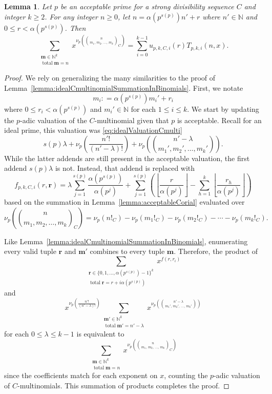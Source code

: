 \documentclass{amsart}
\newtheorem{lemma}[theorem]{Lemma}
\theoremstyle{definition}
\DeclareMathOperator{\total}{total}
\newcommand{\N}{\mathbb{N}}
\newcommand{\colonequal}{\mathrel{\mathop:}=}
\begin{document}
\begin{lemma}\label{lemma:acceptableCmultinomialSummationInBinomial}
Let $p$ be an acceptable prime for a strong divisibility sequence $C$ and integer $k\geq2$. For any integer $n\geq0$, let $n=\alpha(p^{s(p)})n'+r$ where $ n' \in \N $ and $0 \leq r <\alpha(p^{s(p)})$. Then
\[\sum_{\substack{\mathbf{m} \in \N^k \\ \total\mathbf{m} = n}} x^{\nu_p\!\left(\binom{n}{m_1,\, m_2,\, \dots,\, m_k}_C\right)} = \sum\limits_{i=0}^{k-1}u_{p,k,C,i}(r)T_{p,k,i}(n,x).\]
\end{lemma}

\begin{proof}
We rely on generalizing the many similarities to the proof of Lemma~\ref{lemma:idealCmultinomialSummationInBinomials}. 
First, we notate $$m_i\colonequal\alpha(p^{s(p)})m_i'+r_i$$ where $ 0 \leq r_i < \alpha(p^{s(p)}) $ and $ m_i' \in \N $ for each $1 \leq i \leq k$. 
We start by updating the $p$-adic valuation of the $C$-multinomial given that $p$ is acceptable. Recall for an ideal prime, this valuation was \eqref{eq:idealValuationCmulti} $$s(p)\lambda+\nu_p\!\left(\frac{n'!}{(n'-\lambda)!}\right) + \nu_p\!\left(\binom{n'-\lambda}{m_1', m_2', \dots,m_k'}\right). $$ 
While the latter addends are still present in the acceptable valuation, the first addend $s(p)\lambda$ is not. 
Instead, that addend is replaced with 
$$f_{p,k,C,i}(r,\mathbf{r})=\lambda\sum_{j=1}^{s(p)}\frac{\alpha(p^{s(p)})}{\alpha(p^{j})} + \sum_{j=1}^{s(p)}\left( \left\lfloor\frac{r}{\alpha(p^{j})} \right\rfloor - \sum_{h=1}^k\left\lfloor\frac{r_h}{\alpha(p^{j})} \right\rfloor \right)
$$ 
based on the summation in Lemma~\ref{lemma:acceptableCorial} evaluated over $$\nu_p\!\left(\binom{n}{m_1,m_2,\dots,m_k}_C\right)=\nu_p(n!_C)-\nu_p(m_1!_C)-\nu_p(m_2!_C)-\cdots-\nu_p(m_k!_C).$$ 

Like Lemma~\ref{lemma:idealCmultinomialSummationInBinomials}, enumerating every valid tuple $\mathbf{r}$ and $\mathbf{m'}$ combines to every tuple $\mathbf{m}$. Therefore, the product of $$\sum_{\substack{\mathbf{r} \in \{0, 1, \ldots,\alpha(p^{s(p)})-1\}^k \\ \total\mathbf{r} = r+i\alpha(p^{s(p)})}}x^{f(r, r_i)}$$ and 
$$x^{\nu_p\!\left(\frac{n'!}{(n'-\lambda)!}\right)}\sum_{\substack{\mathbf{m'} \in \mathbb{N}^k \\ \total\mathbf{m'} = n'-\lambda}} x^{\nu_p\!\left(\binom{n'-\lambda}{m_1',\, m_2',\, \dots,\, m_k'}\right)}$$
for each $0 \leq \lambda \leq k-1$ is equivalent to $$\sum_{\substack{\mathbf{m} \in \mathbb{N}^k \\ \total\mathbf{m} = n}} x^{\nu_p\left(\binom{n}{m_1,\, m_2,\, \dots,\, m_k}_C\right)}$$ since the coefficients match for each exponent on $x$, counting the $p$-adic valuation of $C$-multinomials.  This summation of products completes the proof.
\end{proof}
\end{document}
